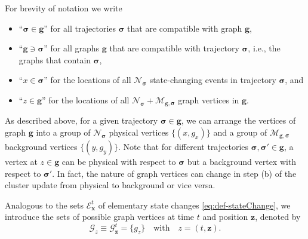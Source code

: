 \documentclass[english,10pt,aps,pra,twocolumn,superscriptaddress,floatfix,fleqn]{revtex4-2}
\newcommand{\mc}[1]{\mathcal{#1}}
\renewcommand{\vec}[1]{{\boldsymbol{#1}}}
\newcommand{\E} {\mc{E}}
\newcommand{\G} {\mc{G}}
\newcommand{\vg}{\vec{g}}
\newcommand{\vs}{\vec{\sigma}}
\newcommand{\vx}{\vec{x}}
\newcommand{\vz}{\vec{z}}
\newcommand{\Np}{\mc{N}}
\newcommand{\Nb}{\mc{M}}
\begin{document}
For brevity of notation we write 
\begin{itemize}
 \item ``$\vs\in\vg$'' for all trajectories $\vs$ that are compatible with graph $\vg$,
 \item ``$\vg\ni\vs$'' for all graphs $\vg$ that are compatible with trajectory $\vs$, i.e., the graphs that contain $\vs$,
 \item ``$x\in\vs$'' for the locations of all $\Np_\vs$ state-changing events in trajectory $\vs$, and
 \item ``$z\in\vg$'' for the locations of all $\Np_\vs+\Nb_{\vg,\vs}$ graph vertices in $\vg$.
\end{itemize}
As described above, for a given trajectory $\vs\in\vg$, we can arrange the vertices of graph $\vg$ into a group of $\Np_\vs$ physical vertices $\{(x,g_x)\}$ and a group of $\Nb_{\vg,\vs}$ background vertices $\{(y,g_y)\}$.
Note that for different trajectories $\vs,\vs'\in\vg$, a vertex at $z\in\vg$ can be physical with respect to $\vs$ but a background vertex with respect to $\vs'$. In fact, the nature of graph vertices can change in step (b) of the cluster update from physical to background or vice versa.

Analogous to the sets $\E_\vx^t$ of elementary state changes \eqref{eq:def-stateChange}, we introduce the sets of possible graph vertices at time $t$ and position $\vz$, denoted by
\begin{equation}\label{eq:def-graphVertices}
	\G_z\equiv\G_\vz^t=\{g_z\}\quad\text{with}\quad z=(t,\vz).
\end{equation}
\end{document}
